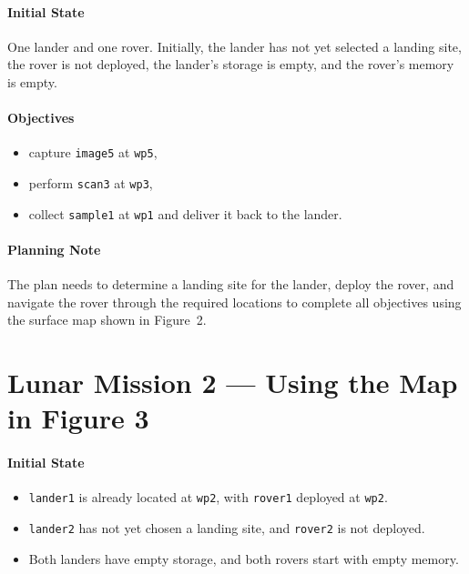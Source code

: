 \documentclass[11pt,a4paper]{article}
\begin{document}
\paragraph{Initial State}
One lander and one rover. Initially, the lander has not yet selected a landing site, the rover is not deployed, the lander’s storage is empty, and the rover’s memory is empty.

\paragraph{Objectives}
\begin{itemize}
  \item capture \texttt{image5} at \texttt{wp5},
  \item perform \texttt{scan3} at \texttt{wp3},
  \item collect \texttt{sample1} at \texttt{wp1} and deliver it back to the lander.
\end{itemize}

\paragraph{Planning Note}
The plan needs to determine a landing site for the lander, deploy the rover, and navigate the rover through the required locations to complete all objectives using the surface map shown in Figure~2.


\section{Lunar Mission 2 — Using the Map in Figure 3}

\paragraph{Initial State}
\begin{itemize}
  \item \texttt{lander1} is already located at \texttt{wp2}, with \texttt{rover1} deployed at \texttt{wp2}.
  \item \texttt{lander2} has not yet chosen a landing site, and \texttt{rover2} is not deployed.
  \item Both landers have empty storage, and both rovers start with empty memory.
\end{itemize}
\end{document}
